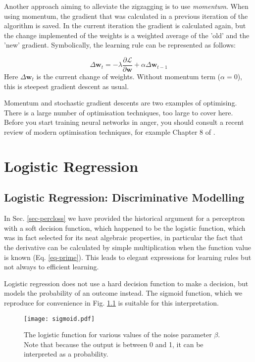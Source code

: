   Another approach aiming to alleviate the zigzagging is to use \emph{momentum}. When using momentum, the gradient that was calculated in a previous iteration
  of the algorithm is saved. In the current iteration the gradient is calculated again, but the change implemented of the weights is a weighted
  average of the 'old' and the 'new' gradient. Symbolically, the learning rule can be represented as follows:

  \begin{equation}
  \Delta  \boldsymbol{w}_{t} =  - \lambda \frac{\partial \mathcal{L}}{\partial \boldsymbol{w}} + \alpha \Delta \boldsymbol{w}_{t-1}
  \end{equation}
  Here $\Delta \boldsymbol{w}_t$ is the current change of weights. Without momentum term ($\alpha = 0$), this is steepest gradient descent as usual.
  
  Momentum and stochastic gradient descents are two examples of optimising. There is a large number of optimisation techniques, too large to cover here. Before you
  start training neural networks in anger, you should consult a recent review of modern optimisation techniques, for example Chapter 8 of \cite{goodfellow2016}.

  \chapter{Logistic Regression}
\section{Logistic Regression: Discriminative Modelling}
\label{eq-logdisciminative}
In Sec. \ref{sec-percloss} we have provided the historical argument for a perceptron with a soft decision function, which happened to be the logistic function, which
was in fact selected for its neat algebraic properties, in particular the fact that the derivative can be calculated by simple multiplication when
the function value is  known (Eq. \ref{eq-prime}). This leads to elegant expressions for learning rules but not always to efficient learning.

Logistic regression does not use a hard decision function to make a decision, but models the probability of an outcome instead. The sigmoid function, which we reproduce for
convenience in Fig. \ref{fig-logistic2} is suitable for this interpretation.

\begin{figure}
  \begin{center}
    \texttt{[image: sigmoid.pdf]}
  \end{center}
  \caption{The logistic function for various values of the noise parameter $\beta$. Note that because the output is between 0 and 1, it can be interpreted as a probability.}
  \label{fig-logistic2}
\end{figure}


